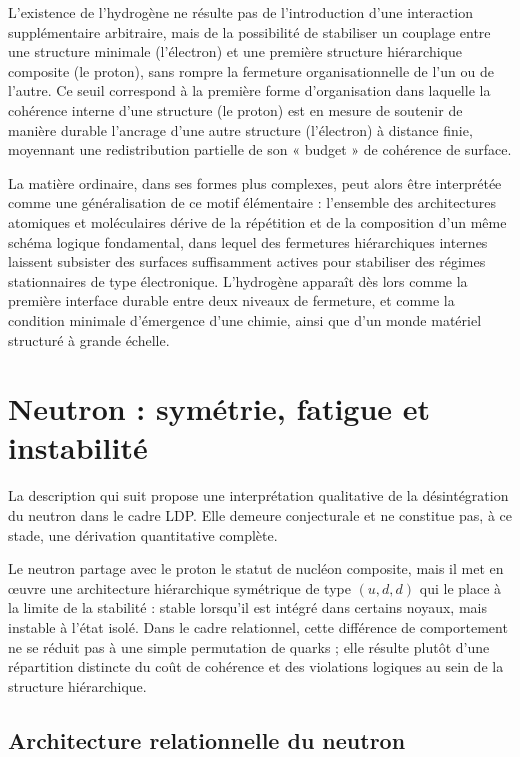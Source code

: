 \documentclass[11pt,a4paper]{article}
\begin{document}
L’existence de l’hydrogène ne résulte pas de l’introduction d’une interaction supplémentaire arbitraire, mais de la possibilité de stabiliser un couplage entre une structure minimale (l’électron) et une première structure hiérarchique composite (le proton), sans rompre la fermeture organisationnelle de l’un ou de l’autre. Ce seuil correspond à la première forme d’organisation dans laquelle la cohérence interne d’une structure (le proton) est en mesure de soutenir de manière durable l’ancrage d’une autre structure (l’électron) à distance finie, moyennant une redistribution partielle de son « budget » de cohérence de surface.

La matière ordinaire, dans ses formes plus complexes, peut alors être interprétée comme une généralisation de ce motif élémentaire : l’ensemble des architectures atomiques et moléculaires dérive de la répétition et de la composition d’un même schéma logique fondamental, dans lequel des fermetures hiérarchiques internes laissent subsister des surfaces suffisamment actives pour stabiliser des régimes stationnaires de type électronique. L’hydrogène apparaît dès lors comme la première interface durable entre deux niveaux de fermeture, et comme la condition minimale d’émergence d’une chimie, ainsi que d’un monde matériel structuré à grande échelle.

\section{Neutron : symétrie, fatigue et instabilité}

La description qui suit propose une interprétation qualitative de la désintégration du neutron dans le cadre LDP. Elle demeure conjecturale et ne constitue pas, à ce stade, une dérivation quantitative complète.

Le neutron partage avec le proton le statut de nucléon composite, mais il met en œuvre une architecture hiérarchique symétrique de type \(\left(u,d,d\right)\) qui le place à la limite de la stabilité : stable lorsqu’il est intégré dans certains noyaux, mais instable à l’état isolé. Dans le cadre relationnel, cette différence de comportement ne se réduit pas à une simple permutation de quarks ; elle résulte plutôt d’une répartition distincte du coût de cohérence et des violations logiques au sein de la structure hiérarchique.

\subsection{Architecture relationnelle du neutron}
\end{document}
